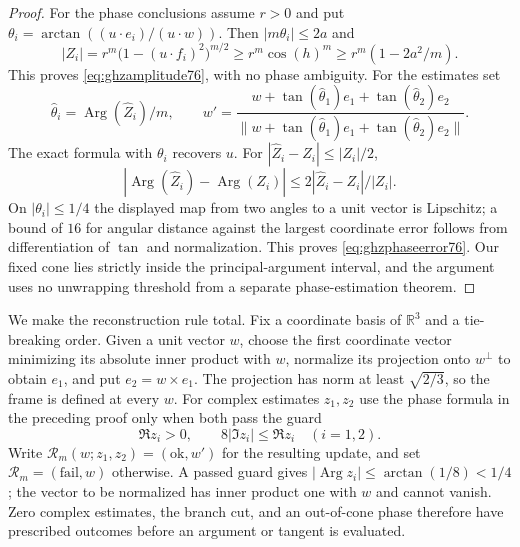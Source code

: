 \begin{proof}
For the phase conclusions assume $r>0$ and put
$\theta_i=\arctan((u\cdot e_i)/(u\cdot w))$.  Then
$|m\theta_i|\le2a$ and
\[
 |Z_i|=r^m\bigl(1-(u\cdot f_i)^2\bigr)^{m/2}
       \ge r^m\cos(h)^m
       \ge r^m(1-2a^2/m).
\]
This proves \eqref{eq:ghzamplitude76}, with no phase ambiguity.
For the estimates set
\[
 \widehat\theta_i=\operatorname{Arg}(\widehat Z_i)/m,
 \qquad
 w'=\frac{w+\tan(\widehat\theta_1)e_1
                   +\tan(\widehat\theta_2)e_2}
              {\|w+\tan(\widehat\theta_1)e_1
                   +\tan(\widehat\theta_2)e_2\|}.
\]
The exact formula with $\theta_i$ recovers $u$.  For
$|\widehat Z_i-Z_i|\le|Z_i|/2$,
\[
 |\operatorname{Arg}(\widehat Z_i)-\operatorname{Arg}(Z_i)|
       \le2|\widehat Z_i-Z_i|/|Z_i|.
\]
On $|\theta_i|\le1/4$ the displayed map from two angles to a unit
vector is Lipschitz; a bound of $16$ for angular distance against
the largest coordinate error follows from differentiation of
$\tan$ and normalization.  This proves
\eqref{eq:ghzphaseerror76}.  Our fixed cone lies strictly inside
the principal-argument interval, and the argument uses no
unwrapping threshold from a separate phase-estimation theorem.
\end{proof}

We make the reconstruction rule total.  Fix a coordinate basis of
$\mathbb R^3$ and a tie-breaking order.  Given a unit vector $w$,
choose the first coordinate vector minimizing its absolute inner
product with $w$, normalize its projection onto $w^\perp$ to obtain
$e_1$, and put $e_2=w\times e_1$.  The projection has norm at least
$\sqrt{2/3}$, so the frame is defined at every $w$.
For complex estimates $z_1,z_2$ use the phase formula in the preceding
proof only when both pass the guard
\begin{equation}\label{eq:learnphaseguard77}
 \Re z_i>0,\qquad 8|\Im z_i|\le\Re z_i\quad(i=1,2).
\end{equation}
Write $\mathcal R_m(w;z_1,z_2)=(\mathrm{ok},w')$ for the resulting
update, and set $\mathcal R_m=(\mathrm{fail},w)$ otherwise.  A passed
guard gives $|\operatorname{Arg}z_i|\le\arctan(1/8)<1/4$;
the vector to be normalized has inner product one with $w$ and
cannot vanish.  Zero complex estimates, the branch cut, and an
out-of-cone phase therefore have prescribed outcomes before an
argument or tangent is evaluated.

